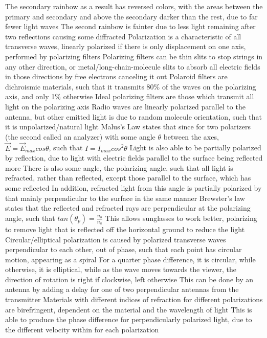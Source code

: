\documentclass[11 pt, twoside]{article}
\newenvironment{outline*}
{
	\begin{outline}[enumerate]
	}
	{\end{outline}
}
\begin{document}
\begin{outline*}
\2 The secondary rainbow as a result has reversed colors, with the areas between the primary and secondary and above the secondary darker than the rest, due to far fewer light waves
\3 The second rainbow is fainter due to less light remaining after two reflections causing some diffracted
\1 Polarization is a characteristic of all transverse waves, linearly polarized if there is only displacement on one axis, performed by polarizing filters
\2 Polarizing filters can be thin slits to stop strings in any other direction, or metal/long-chain-molecule slits to absorb all electric fields in those directions by free electrons canceling it out
\3 Polaroid filters are dichroismic materials, such that it transmits 80\% of the waves on the polarizing axis, and only 1\% otherwise
\3 Ideal polarizing filters are those which transmit all light on the polarizing axis
\2 Radio waves are linearly polarized parallel to the antenna, but other emitted light is due to random molecule orientation, such that it is unpolarized/natural light
\2 Malus's Law states that since for two polarizers (the second called an analyzer) with some angle $\theta$ between the axes, $\vec{E} = \vec{E}_{max}cos\theta$, such that $I = I_{max}cos^2\theta$
\2 Light is also able to be partially polarized by reflection, due to light with electric fields parallel to the surface being reflected more
\3 There is also some angle, the polarizing angle, such that all light is refracted, rather than reflected, except those parallel to the surface, which has some reflected
\4 In addition, refracted light from this angle is partially polarized by that mainly perpendicular to the surface in the same manner
\3 Brewster's law states that the reflected and refracted rays are perpendicular at the polarizing angle, such that $tan(\theta_p) = \frac{n_b}{n_a}$
\3 This allows sunglasses to work better, polarizing to remove light that is reflected off the horizontal ground to reduce the light
\2 Circular/elliptical polarization is caused by polarized transverse waves perpendicular to each other, out of phase, such that each point has circular motion, appearing as a spiral
\3 For a quarter phase difference, it is circular, while otherwise, it is elliptical, while as the wave moves towards the viewer, the direction of rotation is right if clockwise, left otherwise
\3 This can be done by an antenna by adding a delay for one of two perpendicular antennas from the transmitter
\3 Materials with different indices of refraction for different polarizations are birefringent, dependent on the material and the wavelength of light
\4 This is able to produce the phase difference for perpendicularly polarized light, due to the different velocity within for each polarization

\end{outline*}
\end{document}
